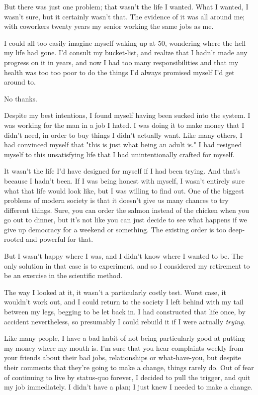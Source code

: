\documentclass[./the-millions-of-gestures.tex]{subfiles}
\begin{document}
But there was just one problem; that wasn't the life I wanted. What I wanted, I
wasn't sure, but it certainly wasn't that. The evidence of it was all around me;
with coworkers twenty years my senior working the same jobs as me.

I could all too easily imagine myself waking up at 50, wondering where the hell
my life had gone. I'd consult my bucket-list, and realize that I hadn't made any
progress on it in years, and now I had too many responsibilities and that my
health was too too poor to do the things I'd always promised myself I'd get
around to.

No thanks.

Despite my best intentions, I found myself having been sucked into the system. I
was working for the man in a job I hated. I was doing it to make money that I
didn't need, in order to buy things I didn't actually want. Like many others, I
had convinced myself that "this is just what being an adult is." I had resigned
myself to this unsatisfying life that I had unintentionally crafted for myself.

It wasn't the life I'd have designed for myself if I had been trying. And that's
because I hadn't been. If I was being honest with myself, I wasn't entirely sure
what that life would look like, but I was willing to find out. One of the
biggest problems of modern society is that it doesn't give us many chances to
try different things. Sure, you can order the salmon instead of the chicken when
you go out to dinner, but it's not like you can just decide to see what happens
if we give up democracy for a weekend or something. The existing order is too
deep-rooted and powerful for that.

But I wasn't happy where I was, and I didn't know where I wanted to be. The only
solution in that case is to experiment, and so I considered my retirement to be
an exercise in the scientific method.

The way I looked at it, it wasn't a particularly costly test. Worst case, it
wouldn't work out, and I could return to the society I left behind with my tail
between my legs, begging to be let back in. I had constructed that life once, by
accident nevertheless, so presumably I could rebuild it if I were actually
\emph{trying}.

Like many people, I have a bad habit of not being particularly good at putting
my money where my mouth is.  I'm sure that you hear
complaints weekly from your friends about their bad jobs, relationships or
what-have-you, but despite their comments that they're going to make a change,
things rarely do. Out of fear of continuing to live by status-quo forever, I
decided to pull the trigger, and quit my job immediately. I didn't have a plan;
I just knew I needed to make a change.
\end{document}
